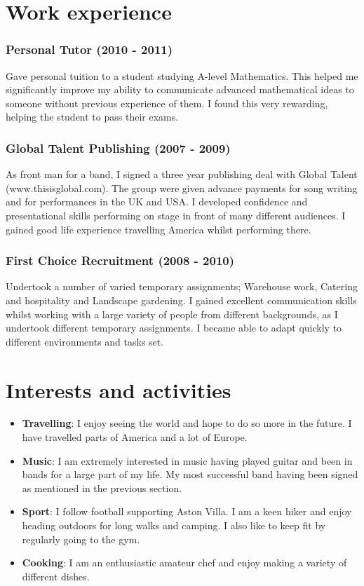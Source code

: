 \documentclass[11pt]{article}
\begin{document}
\section*{Work experience}
\subsubsection*{Personal Tutor (2010 - 2011)}
Gave personal tuition to a student studying A-level Mathematics. This helped me significantly improve my ability to communicate advanced mathematical ideas to someone without previous experience of them. I found this very rewarding, helping the student to pass their exams.    
\subsubsection*{Global Talent Publishing (2007 - 2009)}
As front man for a band, I signed a three year publishing deal with Global Talent (www.thisisglobal.com). The group were given advance payments for song writing and for performances in the UK and USA. I developed confidence and presentational skills performing on stage in front of many different audiences. I gained good life experience travelling America whilst performing there.
\subsubsection*{First Choice Recruitment (2008 - 2010)}
Undertook a number of varied temporary assignments; Warehouse work, Catering and hospitality and Landscape gardening. I gained excellent communication skills whilst working with a large variety of people from different backgrounds, as I undertook different temporary assignments. I became able to adapt quickly to different environments and tasks set.

\section*{Interests and activities}
\begin{itemize}
\item \textbf{Travelling}: I enjoy seeing the world and hope to do so more in the future. I have travelled parts of America and a lot of Europe.
\item \textbf{Music}: I am extremely interested in music having played guitar and been in bands for a large part of my life. My most successful band having been signed as mentioned in the previous section.
\item \textbf{Sport}: I follow football supporting Aston Villa. I am a keen hiker and enjoy heading outdoors for long walks and camping. I also like to keep fit by regularly going to the gym.
\item \textbf{Cooking}: I am an enthusiastic amateur chef and enjoy making a variety of different dishes.
\end{itemize}
\end{document}
